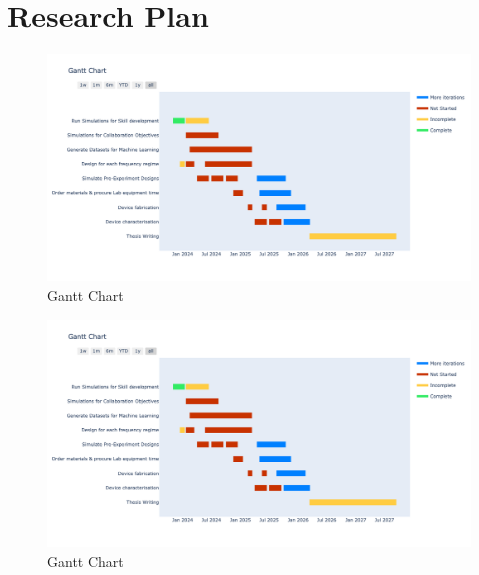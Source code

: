 \section{Research Plan}


\begin{figure}[h]
    \centering
    \includegraphics[width=\textwidth]{figures/introduction/gantt.png}
    \caption{Gantt Chart}
    \label{fig:your_label}
\end{figure}


\begin{figure}
    \centering
    \includegraphics[width=\textwidth]{figures/introduction/gantt.png}
    \caption{Gantt Chart}
    \label{fig:your_label}
\end{figure}
